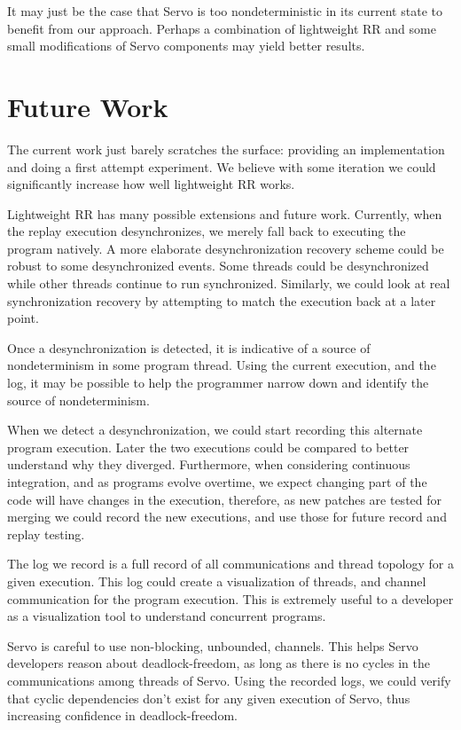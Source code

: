 It may just be the case that Servo is too nondeterministic in its current state to benefit
from our approach. Perhaps a combination of lightweight RR and some small modifications
of Servo components may yield better results.

\section{Future Work}
\label{sec:future_work}
The current work just barely scratches the surface: providing an implementation
and doing a first attempt experiment. We believe with some iteration we could significantly
increase how well lightweight RR works.

Lightweight RR has many possible extensions and future work. Currently, when the replay
execution desynchronizes, we merely fall back to executing the program natively. A more
elaborate desynchronization recovery scheme could be robust to some desynchronized
events. Some threads could be desynchronized while other threads continue to run
synchronized. Similarly, we could look at real synchronization recovery by attempting
to match the execution back at a later point.

Once a desynchronization is detected, it is indicative of a source of nondeterminism
in some program thread. Using the current execution, and the log, it may be possible
to help the programmer narrow down and identify the source of nondeterminism.

When we detect a desynchronization, we could start recording this alternate program
execution. Later the two executions could be compared to better understand why
they diverged. Furthermore, when considering continuous integration, and as programs
evolve overtime, we expect changing part of the code will have changes in the execution,
therefore, as new patches are tested for merging we could record the new executions,
and use those for future record and replay testing.

The log we record is a full record of all communications and thread topology for a
given execution. This log could create a visualization of threads, and channel
communication for the program execution. This is extremely useful to a developer as
a visualization tool to understand concurrent programs.

Servo is careful to use non-blocking, unbounded, channels. This helps Servo developers
reason about deadlock-freedom, as long as there is no cycles in the communications among
threads
of Servo. Using the recorded logs, we could verify that cyclic dependencies don't exist
for any given execution of Servo, thus increasing confidence in deadlock-freedom.

